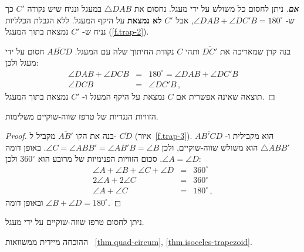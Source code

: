 \begin{proof}[\textbf{אם}]
ניתן לחסום כל משולש על ידי מעגל. נחסום את 
$\triangle DAB$
במעגל ונניח שיש נקודה 
$C'$
כך ש-%
$\angle DAB + \angle DC'B = 180^\circ$, 
אבל
$C'$
\textbf{לא נמצאת}
על היקף המעגל. ללא הגבלת הכלליות נניח ש-%
$C'$
נמצאת בתוך המעגל 
(\ref{f.trap-2}).

בנה קרן שמאריכה את 
$\overline{DC'}$
ותהי 
$C$
נקודת החיתוך שלה עם המעגל.
$\overline{ABCD}$
חסום על ידי מעגל ולכן:
\begin{eqnarray*}
\angle DAB + \angle DCB &=&  180^\circ = \angle DAB + \angle DC'B\\
\angle DCB &=& \angle DC'B\,,
\end{eqnarray*}
תוצאה שאינה אפשרית אם 
$C$
נמצאת על היקף המעגל ו-%
$C'$
נמצאת בתוך המעגל.
\end{proof}

\begin{theorem}\label{thm.isoceles-trapezoid}
הזוויות הנגדיות של טרפז שווה-שוקיים משלימות.
\end{theorem}
\begin{proof}
בנה את הקו 
$\overline{AB'}$
מקביל ל-%
$\overline{CD}$
(איור~\ref{f.trap-3}).
$\overline{AB'CD}$
הוא מקבילית ו-%
$\triangle ABB'$
הוא משולש שווה-שוקיים, ולכן
$\angle C= \angle ABB' = \angle AB'B = \angle B$.
באופן דומה
$\angle A = \angle D$.
סכום הזוויות הפנימיות של מרובע הוא 
$360^\circ$
ולכן:
\begin{eqnarray*}
\angle A + \angle B + \angle C + \angle D &=& 360^\circ\\
2\angle A + 2 \angle C &=& 360^\circ\\
\angle A +  \angle C &=& 180^\circ\,,
\end{eqnarray*}
ובאופן דומה
$\angle B +  \angle D = 180^\circ$.
\end{proof}

\begin{theorem}
ניתן לחסום טרפז שווה-שוקיים על ידי מעגל.
\end{theorem}
ההוכחה מיידית ממשוואות%
~\ref{thm.quad-circum}, \ref{thm.isoceles-trapezoid}.

